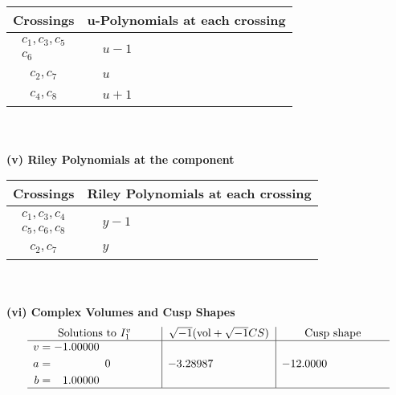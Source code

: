 \documentclass[1p]{elsarticle_modified}
\theoremstyle{definition}
\newcommand{\I}{\sqrt{-1}}
\begin{document}
\begin{tabular}{m{50pt}|m{274pt}}
Crossings & \hspace{64pt}u-Polynomials at each crossing \\
\hline $$\begin{aligned}c_{1},c_{3},c_{5}\\c_{6}\end{aligned}$$&$\begin{aligned}
&u-1
\end{aligned}$\\
\hline $$\begin{aligned}c_{2},c_{7}\end{aligned}$$&$\begin{aligned}
&u
\end{aligned}$\\
\hline $$\begin{aligned}c_{4},c_{8}\end{aligned}$$&$\begin{aligned}
&u+1
\end{aligned}$\\
\hline
\end{tabular}\\~\\
\newpage\renewcommand{\arraystretch}{1}
\flushleft \textbf{(v) Riley Polynomials at the component}\newline \\
\begin{tabular}{m{50pt}|m{274pt}}
Crossings & \hspace{64pt}Riley Polynomials at each crossing \\
\hline $$\begin{aligned}c_{1},c_{3},c_{4}\\c_{5},c_{6},c_{8}\end{aligned}$$&$\begin{aligned}
&y-1
\end{aligned}$\\
\hline $$\begin{aligned}c_{2},c_{7}\end{aligned}$$&$\begin{aligned}
&y
\end{aligned}$\\
\hline
\end{tabular}\\~\\
\newpage\flushleft \textbf{(vi) Complex Volumes and Cusp Shapes}
$$\begin{array}{c|c|c}  
\text{Solutions to }I^v_{1}& \I (\text{vol} + \sqrt{-1}CS) & \text{Cusp shape}\\
 \hline 
\begin{aligned}
v &= -1.00000\phantom{ +0.000000I} \\
a &= \phantom{-0.000000 } 0 \\
b &= \phantom{-}1.00000\phantom{ +0.000000I}\end{aligned}
 & -3.28987\phantom{ +0.000000I} & -12.0000\phantom{ +0.000000I}\\
 \hline 
 \end{array}$$\newpage
\end{document}
